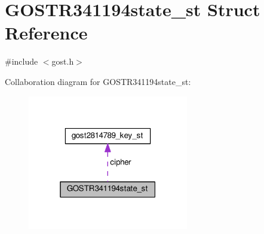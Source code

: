 \hypertarget{struct_g_o_s_t_r341194state__st}{}\section{G\+O\+S\+T\+R341194state\+\_\+st Struct Reference}
\label{struct_g_o_s_t_r341194state__st}


{\ttfamily \#include $<$gost.\+h$>$}



Collaboration diagram for G\+O\+S\+T\+R341194state\+\_\+st\+:
\nopagebreak
\begin{figure}[H]
\begin{center}
\leavevmode
\includegraphics[width=199pt]{struct_g_o_s_t_r341194state__st__coll__graph}
\end{center}
\end{figure}
